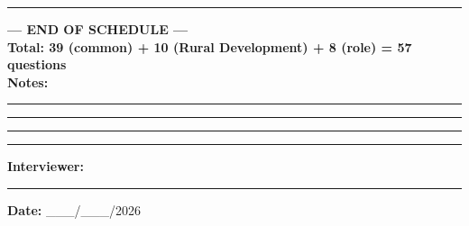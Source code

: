 \documentclass[10pt,a4paper]{article}
\begin{document}
\vspace{3pt}\noindent\rule{\textwidth}{1pt}
\begin{center}
{\large\bfseries --- END OF SCHEDULE ---}\\[2pt]
\textbf{Total: 39 (common) + 10 (Rural Development) + 8 (role) = 57 questions}\\[8pt]
\textbf{Notes:}\vspace{3pt}

\rule{\textwidth}{0.4pt}\vspace{3pt}
\rule{\textwidth}{0.4pt}\vspace{3pt}
\rule{\textwidth}{0.4pt}\vspace{3pt}
\rule{\textwidth}{0.4pt}\vspace{4pt}

\textbf{Interviewer:} \rule{5cm}{0.4pt}\qquad\textbf{Date:} \_\_\_/\_\_\_/2026
\end{center}
\end{document}
